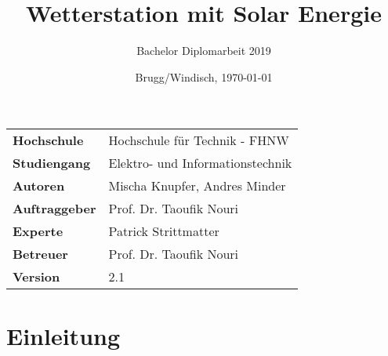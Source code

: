 \documentclass[final]{fhnwreport}       %
\title{\Huge{\textbf{Wetterstation mit Solar Energie}}\\}          %
\author{\huge{Bachelor Diplomarbeit 2019}}          %
\date{Brugg/Windisch, \today}             %
\begin{document}
\maketitle
\vspace*{-0.5cm}						    %
\vfill
\begin{figure}[H]
\centering
\end{figure}
\vfill

{
\renewcommand\arraystretch{2}
\begin{center}
\begin{tabular}{p{4cm} l}
\textbf{Hochschule}				&    Hochschule für Technik - FHNW\\
\textbf{Studiengang}			&    Elektro- und Informationstechnik\\
\textbf{Autoren}				& 	Mischa Knupfer, Andres Minder\\
\textbf{Auftraggeber}			&    Prof. Dr. Taoufik Nouri\\
\textbf{Experte}				&	Patrick Strittmatter\\
\textbf{Betreuer}				&    Prof. Dr. Taoufik Nouri\\
\textbf{Version}				&    2.1 %
\end{tabular}
\end{center}
}

\clearpage
			
\thispagestyle{empty}


\tableofcontents
\clearpage


\part{Einleitung}
\label{part:EinleitenderTeil}




\end{document}
